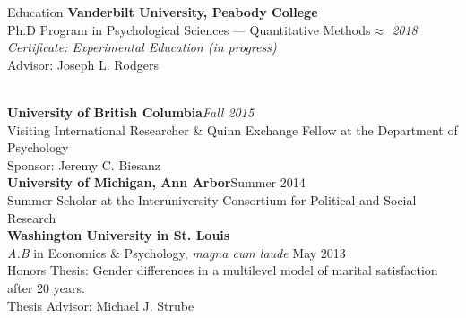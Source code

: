 \documentclass {resume}
\begin{document}
\nonfrenchspacing
\thispagestyle{myheadings}
\markright{\em{\textrm \today}}

\begin{rSection}{\textrm{Education}}
{\bf Vanderbilt University, Peabody College} \\
Ph.D Program in Psychological Sciences --- Quantitative Methods\hfill  {\em $\approx$ 2018} \\
\hspace* {3 mm}\textit{Certificate: Experimental Education (in progress)}\\
\hspace* {3 mm}Advisor: Joseph L. Rodgers\begin{comment}\smallskip\\
\textit{M.S. in Psychological Sciences} \hfill  {\em $\approx$ 2016} \\
\hspace* {3 mm}Masters Thesis: Extensions of discordant kinship models.\\
\hspace* {3 mm}Thesis Committee: Joseph L. Rodgers \& Kristopher J. Preacher\end{comment}
\medskip\\
\textbf{University of British Columbia}\hfill \textit{Fall 2015}\\ 
Visiting International Researcher \& Quinn Exchange Fellow at the Department of Psychology\\
\hspace* {3 mm} Sponsor: Jeremy C. Biesanz\medskip\\
\textbf{University of Michigan, Ann Arbor}\hfill Summer 2014\\ 
Summer Scholar at the Interuniversity Consortium for Political and Social Research\medskip\\
{\bf Washington University in St. Louis}\\
{\em A.B} in Economics \& Psychology, \textit{magna cum laude} \hfill  {May 2013} \\
\hspace* {3 mm}Honors Thesis: Gender differences in a multilevel model of marital satisfaction after 20 years.\\
\hspace* {3 mm}Thesis Advisor: Michael J. Strube%
\end{rSection}
\end{document}
